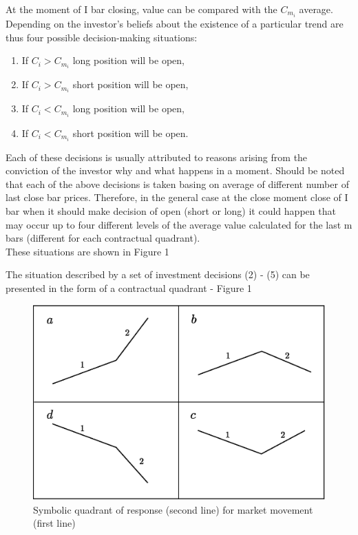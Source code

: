 \documentclass{tewiart}
\begin{document}
At the moment of I bar closing, value can be compared with the $C_{m_{i}}$ average. Depending on the investor's beliefs about the existence of a particular trend are thus four possible decision-making situations:
\begin{enumerate}
\item If $C_i  > C_{m_{i}}$  long position will be open,
\item If $C_i  > C_{m_{i}}$  short position will be open,
\item If $C_i  < C_{m_{i}}$  long position will be open,
\item If $C_i  < C_{m_{i}}$  short position will be open.
\end{enumerate}


Each of these decisions is usually attributed to reasons arising from the conviction of the investor why and what happens in a moment. Should be noted that each of the above decisions is taken basing on average of different number of last close bar prices. Therefore, in the general case at the close moment close of I bar when it should make decision of open (short or long) it could happen that may occur up to four different levels of the average value calculated for the last m bars (different for each contractual quadrant).\\
These situations are shown in Figure 1

The situation described by a set of investment decisions (2) - (5) can be presented in the form of a contractual quadrant - Figure 1


\begin{figure}[h!]
 \centering
 \includegraphics[width=\textwidth]{Rysunek0_all2.eps}
 \caption{Symbolic quadrant of response (second line) for market movement (first line)}
\end{figure}
\FloatBarrier
\end{document}
